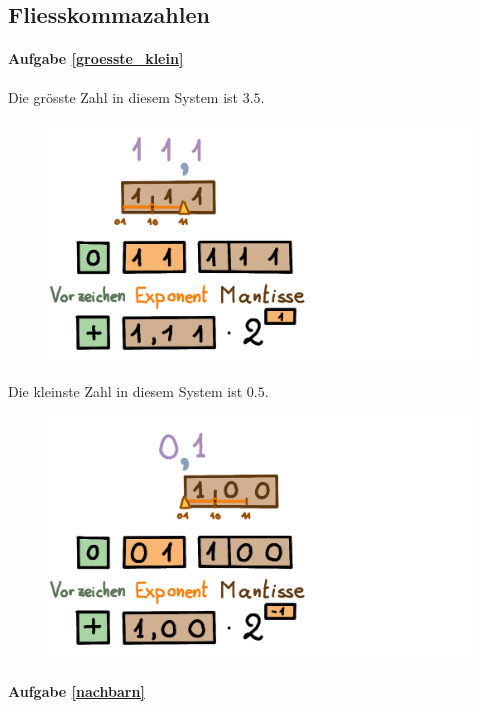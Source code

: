\subsection{Fliesskommazahlen}

\paragraph{Aufgabe \ref{groesste_klein}}
Die grösste Zahl in diesem System ist \(3.5\).
\begin{figure}[H]
\centering
\includegraphics[width=0.65\linewidth]{Pictures/groessteZahl3_klein.png}
\end{figure}

Die kleinste Zahl in diesem System ist \(0.5\).
\begin{figure}[H]
\centering
\includegraphics[width=0.65\linewidth]{Pictures/kleinsteZahl3_klein.png}
\end{figure}


\paragraph{Aufgabe \ref{nachbarn}}

